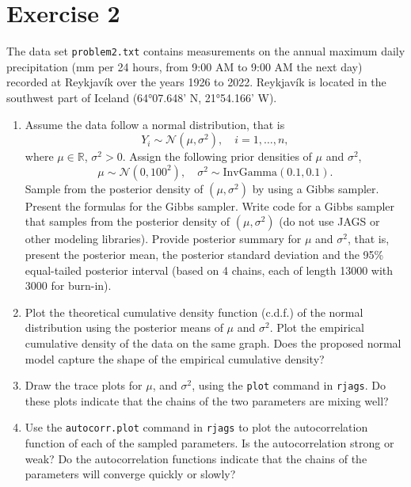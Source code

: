 \documentclass[
]{homework}
\begin{document}
\newpage

\section{Exercise 2}\label{exercise-2}

The data set \texttt{problem2.txt} contains measurements on the annual maximum daily precipitation (mm per 24 hours, from 9:00 AM to 9:00 AM the next day) recorded
at Reykjavík over the years 1926 to 2022. Reykjavík is located in the southwest part of Iceland (64°07.648' N, 21°54.166' W).

\begin{enumerate}[label = (\alph*)]
  \item Assume the data follow a normal distribution, that is
  $$
    Y_i \sim \mathcal N(\mu, \sigma^2), \quad i = 1, \ldots, n,
  $$
  where $\mu \in \mathbb R$, $\sigma^2 > 0$. Assign the following prior densities of $\mu$ and $\sigma^2$,
  $$
    \mu \sim \mathcal N(0, 100^2), \quad \sigma^2 \sim \mathrm{InvGamma}(0.1, 0.1).
  $$
  Sample from the posterior density of $(\mu, \sigma^2)$ by using a Gibbs sampler. Present the formulas for the Gibbs sampler.
  Write code for a Gibbs sampler that samples from the posterior density of $(\mu, \sigma^2)$ (do not use \textsf{JAGS} or other modeling
  libraries). Provide posterior summary for $\mu$ and $\sigma^2$, that is, present the posterior mean, the posterior standard deviation and
  the 95\% equal-tailed posterior interval (based on 4 chains, each of length 13000 with 3000 for burn-in).
  
  \item Plot the theoretical cumulative density function (c.d.f.) of the normal distribution using the posterior means of $\mu$ and $\sigma^2$.
  Plot the empirical cumulative density of the data on the same graph. Does the proposed normal model capture the shape of the empirical cumulative
  density?
  
  \item Draw the trace plots for $\mu$, and $\sigma^2$, using the \texttt{plot} command in \texttt{rjags}. Do these plots indicate that the chains of the two parameters
  are mixing well?
  
  \item Use the \texttt{autocorr.plot} command in \texttt{rjags} to plot the autocorrelation function of each of the sampled parameters. Is the autocorrelation strong or
  weak? Do the autocorrelation functions indicate that  the chains of the parameters will converge quickly or slowly?
  

\end{enumerate}
\end{document}
